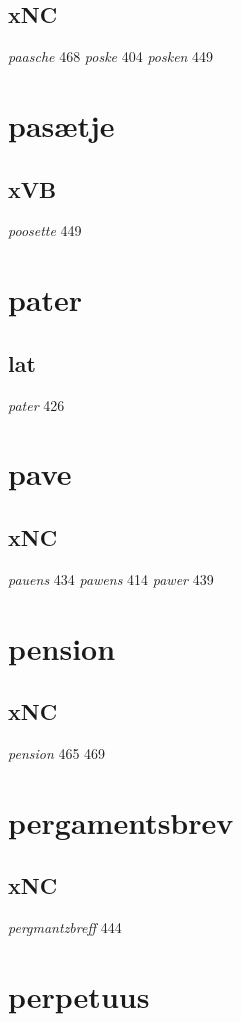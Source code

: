 \documentclass[a4paper,twocolumn]{article}
\begin{document}
\subsection{xNC}
\label{sec:orgc5d8506}
\emph{paasche} 468 \emph{poske} 404 \emph{posken} 449 
\section{pasætje}
\label{sec:org29d9f31}
\subsection{xVB}
\label{sec:orgd382ecb}
\emph{poosette} 449 
\section{pater}
\label{sec:org4fb3e63}
\subsection{lat}
\label{sec:orga8b712c}
\emph{pater} 426 
\section{pave}
\label{sec:orga52082d}
\subsection{xNC}
\label{sec:orgaa1f78c}
\emph{pauens} 434 \emph{pawens} 414 \emph{pawer} 439 
\section{pension}
\label{sec:orgd036c25}
\subsection{xNC}
\label{sec:orgeeb5505}
\emph{pension} 465 469 
\section{pergamentsbrev}
\label{sec:orgcf35f2f}
\subsection{xNC}
\label{sec:org17d269f}
\emph{pergmantzbreff} 444 
\section{perpetuus}
\label{sec:orgb2bcecd}
\end{document}
